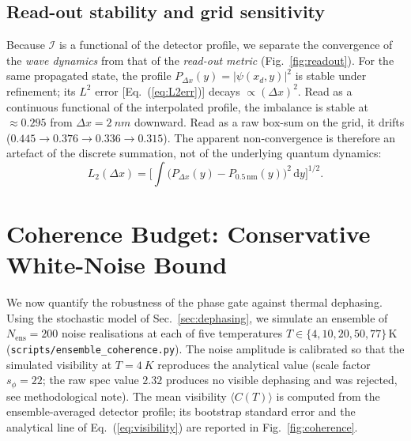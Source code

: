 \documentclass[11pt,a4paper]{article}
\newcommand{\expt}[1]{\langle#1\rangle}
\newcommand{\dd}{\mathrm{d}}
\begin{document}
\subsection{Read-out stability and grid sensitivity}
\label{sec:readout}

Because $\mathcal{I}$ is a functional of the detector profile, we separate 
the convergence of the \emph{wave dynamics} from that of the \emph{read-out 
metric} (Fig.~\ref{fig:readout}). For the same propagated state, the profile 
$P_{\Delta x}(y)=|\psi(x_d,y)|^2$ is stable under refinement; its $L^2$ error 
[Eq.~(\ref{eq:L2err})] decays $\propto(\Delta x)^2$. Read as a continuous 
functional of the interpolated profile, the imbalance is stable at 
$\approx 0.295$ from $\Delta x=\SI{2}{nm}$ downward. Read as a raw box-sum on 
the grid, it drifts ($0.445\to0.376\to0.336\to0.315$). The apparent 
non-convergence is therefore an artefact of the discrete summation, not of 
the underlying quantum dynamics:
\begin{equation}
L_2(\Delta x) = \Big[\int\!\big(P_{\Delta x}(y)-P_{0.5\,\text{nm}}(y)\big)^2\,
\dd y\Big]^{1/2}.
\label{eq:L2err}
\end{equation}

\section{Coherence Budget: Conservative White-Noise Bound}
\label{sec:coherence}

We now quantify the robustness of the phase gate against thermal dephasing. 
Using the stochastic model of Sec.~\ref{sec:dephasing}, we simulate an 
ensemble of $N_{\text{ens}}=200$ noise realisations at each of five 
temperatures $T\in\{4,10,20,50,77\}\,$K 
(\texttt{scripts/ensemble\_coherence.py}). The noise amplitude is calibrated 
so that the simulated visibility at $T=\SI{4}{K}$ reproduces the analytical 
value (scale factor $s_\phi=22$; the raw spec value $2.32$ produces no 
visible dephasing and was rejected, see methodological note). The mean 
visibility $\expt{C(T)}$ is computed from the ensemble-averaged detector 
profile; its bootstrap standard error and the analytical line of 
Eq.~(\ref{eq:visibility}) are reported in Fig.~\ref{fig:coherence}.
\end{document}
